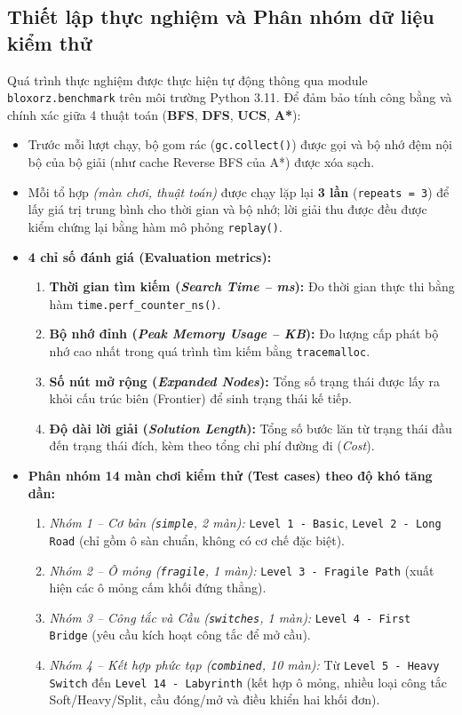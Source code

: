 \documentclass[12pt,a4paper]{article}
\begin{document}
\subsection{Thiết lập thực nghiệm và Phân nhóm dữ liệu kiểm thử}
Quá trình thực nghiệm được thực hiện tự động thông qua module \texttt{bloxorz.benchmark} trên môi trường Python 3.11. Để đảm bảo tính công bằng và chính xác giữa 4 thuật toán (\textbf{BFS}, \textbf{DFS}, \textbf{UCS}, \textbf{A*}):
\begin{itemize}
    \item Trước mỗi lượt chạy, bộ gom rác (\texttt{gc.collect()}) được gọi và bộ nhớ đệm nội bộ của bộ giải (như cache Reverse BFS của A*) được xóa sạch.
    \item Mỗi tổ hợp \emph{(màn chơi, thuật toán)} được chạy lặp lại \textbf{3 lần} (\texttt{repeats = 3}) để lấy giá trị trung bình cho thời gian và bộ nhớ; lời giải thu được đều được kiểm chứng lại bằng hàm mô phỏng \texttt{replay()}.
    \item \textbf{4 chỉ số đánh giá (Evaluation metrics):}
    \begin{enumerate}
        \item \textbf{Thời gian tìm kiếm (\emph{Search Time -- ms}):} Đo thời gian thực thi bằng hàm \texttt{time.perf\_counter\_ns()}.
        \item \textbf{Bộ nhớ đỉnh (\emph{Peak Memory Usage -- KB}):} Đo lượng cấp phát bộ nhớ cao nhất trong quá trình tìm kiếm bằng \texttt{tracemalloc}.
        \item \textbf{Số nút mở rộng (\emph{Expanded Nodes}):} Tổng số trạng thái được lấy ra khỏi cấu trúc biên (Frontier) để sinh trạng thái kế tiếp.
        \item \textbf{Độ dài lời giải (\emph{Solution Length}):} Tổng số bước lăn từ trạng thái đầu đến trạng thái đích, kèm theo tổng chi phí đường đi (\emph{Cost}).
    \end{enumerate}
    \item \textbf{Phân nhóm 14 màn chơi kiểm thử (Test cases) theo độ khó tăng dần:}
    \begin{enumerate}
        \item \emph{Nhóm 1 -- Cơ bản (\texttt{simple}, 2 màn):} \texttt{Level 1 - Basic}, \texttt{Level 2 - Long Road} (chỉ gồm ô sàn chuẩn, không có cơ chế đặc biệt).
        \item \emph{Nhóm 2 -- Ô mỏng (\texttt{fragile}, 1 màn):} \texttt{Level 3 - Fragile Path} (xuất hiện các ô mỏng cấm khối đứng thẳng).
        \item \emph{Nhóm 3 -- Công tắc và Cầu (\texttt{switches}, 1 màn):} \texttt{Level 4 - First Bridge} (yêu cầu kích hoạt công tắc để mở cầu).
        \item \emph{Nhóm 4 -- Kết hợp phức tạp (\texttt{combined}, 10 màn):} Từ \texttt{Level 5 - Heavy Switch} đến \texttt{Level 14 - Labyrinth} (kết hợp ô mỏng, nhiều loại công tắc Soft/Heavy/Split, cầu đóng/mở và điều khiển hai khối đơn).
    \end{enumerate}
\end{itemize}
\end{document}
